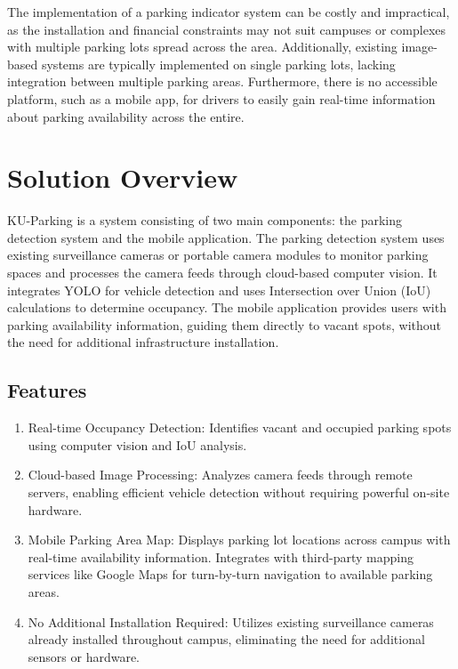 The implementation of a parking indicator system can be costly and impractical, as the installation and financial constraints may not suit campuses or complexes with multiple parking lots spread across the area. Additionally, existing image-based systems are typically implemented on single parking lots, lacking integration between multiple parking areas. Furthermore, there is no accessible platform, such as a mobile app, for drivers to easily gain real-time information about parking availability across the entire.

\section{Solution Overview}
\label{section:solution-overview}

KU-Parking is a system consisting of two main components: the parking detection system and the mobile application. The parking detection system uses existing surveillance cameras or portable camera modules to monitor parking spaces and processes the camera feeds through cloud-based computer vision. It integrates YOLO for vehicle detection and uses Intersection over Union (IoU) calculations to determine occupancy. The mobile application provides users with parking availability information, guiding them directly to vacant spots, without the need for additional infrastructure installation.

\subsection{Features}
\label{subsection:features}

\begin{enumerate}[leftmargin=80pt]
    \item Real-time Occupancy Detection: Identifies vacant and occupied parking spots using computer vision and IoU analysis.
    
    \item Cloud-based Image Processing: Analyzes camera feeds through remote servers, enabling efficient vehicle detection without requiring powerful on-site hardware.
    
    \item Mobile Parking Area Map: Displays parking lot locations across campus with real-time availability information. Integrates with third-party mapping services like Google Maps for turn-by-turn navigation to available parking areas.
    
    \item No Additional Installation Required: Utilizes existing surveillance cameras already installed throughout campus, eliminating the need for additional sensors or hardware.
\end{enumerate}

